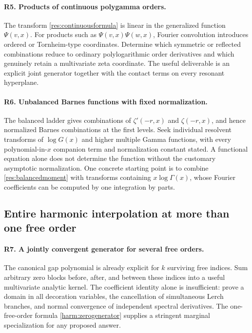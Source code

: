 \documentclass[11pt,a4paper]{article}
\numberwithin{equation}{section}
\theoremstyle{definition}
\theoremstyle{remark}
\begin{document}
\paragraph{R5. Products of continuous polygamma orders.}
The transform \eqref{res:continuousformula} is linear in
the generalized function $\Psi(v,x)$. For products such
as $\Psi(v,x)\Psi(w,x)$, Fourier convolution introduces
ordered or Tornheim-type coordinates. Determine which
symmetric or reflected combinations reduce to ordinary
polylogarithmic order derivatives and which genuinely
retain a multivariate zeta coordinate. The useful
deliverable is an explicit joint generator together with
the contact terms on every resonant hyperplane.

\paragraph{R6. Unbalanced Barnes functions with fixed normalization.}
The balanced ladder gives combinations of
$\zeta'(-r,x)$ and $\zeta(-r,x)$, and hence normalized
Barnes combinations at the first levels. Seek individual
resolvent transforms of $\log G(x)$ and higher multiple
Gamma functions, with every polynomial-in-$x$ companion
term and normalization constant stated. A functional
equation alone does not determine the function without
the customary asymptotic normalization. One concrete
starting point is to combine \eqref{res:balancedmoment}
with transforms containing $x\log\Gamma(x)$, whose
Fourier coefficients can be computed by one integration
by parts.

\subsection{Entire harmonic interpolation at more than one free order}

\paragraph{R7. A jointly convergent generator for several free orders.}
The canonical gap polynomial is already explicit for
$k$ surviving free indices. Sum arbitrary zero blocks
before, after, and between these indices into a useful
multivariate analytic kernel. The coefficient identity
alone is insufficient: prove a domain in all decoration
variables, the cancellation of simultaneous Lerch
branches, and normal convergence of independent spectral
derivatives. The one-free-order formula
\eqref{harm:zerogenerator} supplies a stringent marginal
specialization for any proposed answer.
\end{document}
